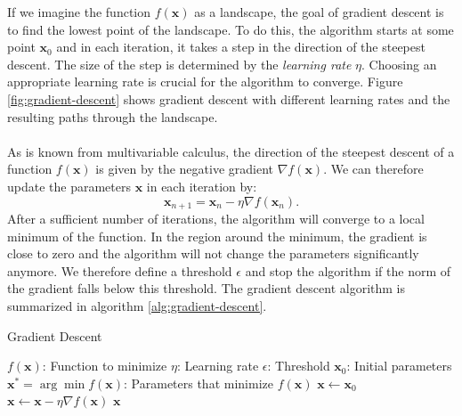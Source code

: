 If we imagine the function $f(\bm{x})$ as a landscape, the goal of gradient descent is to find the lowest point of the landscape.
To do this, the algorithm starts at some point $\bm{x}_0$ and in each iteration, it takes a step in the direction of the steepest descent.
The size of the step is determined by the \textit{learning rate} $\eta$.
Choosing an appropriate learning rate is crucial for the algorithm to converge.
Figure \ref{fig:gradient-descent} shows gradient descent with different learning rates and the resulting paths through the landscape.
\\
\\
As is known from multivariable calculus, the direction of the steepest descent of a function $f(\bm{x})$ is given by the negative gradient $\nabla f(\bm{x})$.
We can therefore update the parameters $\bm{x}$ in each iteration by:
\begin{equation}
    \bm{x}_{n+1} = \bm{x}_n - \eta \nabla f(\bm{x}_n) \text{.}
    \label{eq:gradient-descent}
\end{equation}
After a sufficient number of iterations, the algorithm will converge to a local minimum of the function.
In the region around the minimum, the gradient is close to zero and the algorithm will not change the parameters significantly anymore.
We therefore define a threshold $\epsilon$ and stop the algorithm if the norm of the gradient falls below this threshold.
The gradient descent algorithm is summarized in algorithm \ref{alg:gradient-descent}.
\begin{algorithm}
    \caption{Gradient Descent}
    \label{alg:gradient-descent}
    \begin{algorithmic}[1]
        \renewcommand{\algorithmicensure}{\textbf{Output:}}
        \Require
            \Statex $f(\bm{x})$: Function to minimize
            \Statex $\eta$: Learning rate
            \Statex $\epsilon$: Threshold
            \Statex $\bm{x}_0$: Initial parameters
        \Ensure $\bm{x^*}=\arg\min f(\bm{x})$: Parameters that minimize $f(\bm{x})$
        \Statex
        \State $\bm{x} \gets \bm{x}_0$ 
         
            \State $\bm{x} \gets \bm{x} - \eta \nabla f(\bm{x})$ 
        \EndWhile
        \State \Return $\bm{x}$ 
    \end{algorithmic}
\end{algorithm}

